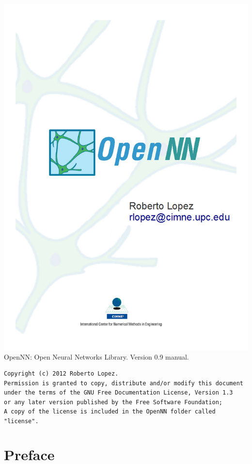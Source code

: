 \documentclass[pdftex, a4paper, 10pt]{book}
\begin{document}
\includegraphics[width=1.1\textwidth]{cover.png}
OpenNN: Open Neural Networks Library. \newline
Version 0.9 manual. 

\vspace{5cm}

\begin{verbatim}
Copyright (c) 2012 Roberto Lopez.
Permission is granted to copy, distribute and/or modify this document
under the terms of the GNU Free Documentation License, Version 1.3
or any later version published by the Free Software Foundation;
A copy of the license is included in the OpenNN folder called "license". 
\end{verbatim}
      
\chapter*{Preface}	
	
 
\end{document}
